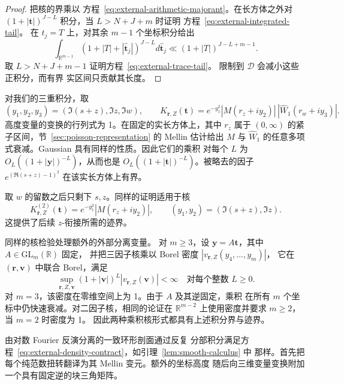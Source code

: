 \begin{proof}
把核的界乘以
方程~\eqref{eq:external-arithmetic-majorant}。在长方体之外对
$(1+|\boldsymbol t|)^{J-L}$ 积分，当 $L>N+J+m$ 时证明
方程~\eqref{eq:external-integrated-tail}。
在 $t_j=T$ 上，对其余 $m-1$ 个坐标积分给出
\[
 \int_{\mathbb R^{m-1}}
 (1+|T|+|\widehat{\boldsymbol t}_j|)^{J-L}
 d\widehat{\boldsymbol t}_j
 \ll(1+|T|)^{J-L+m-1}.
\]
取 $L>N+J+m-1$ 证明方程~\eqref{eq:external-trace-tail}。
限制到 $\mathcal D$ 会减小这些正积分，而有界
实区间只贡献其长度。
\end{proof}

对我们的三重积分，取
\[
 (y_1,y_2,y_3)=(\Im(s+z),\Im z,\Im w),\qquad
 K_{\boldsymbol r,Z}(\boldsymbol t)
 =e^{-y_1^2}|M(r_z+iy_2)|\,|\widehat W_1(r_w+iy_3)|.
\]
高度变量的变换的行列式为 1。在固定的实长方体上，其中 $r_z$ 属于
$(0,\infty)$ 的紧子区间，节~\ref{sec:poisson-representation} 的 Mellin 估计给出 $M$ 与
$\widehat W_1$ 的任意多项式衰减。Gaussian 具有同样的性质。因此它们的乘积
对每个 $L$ 为 $O_L((1+|\boldsymbol y|)^{-L})$，从而也是
$O_L((1+|\boldsymbol t|)^{-L})$。被略去的因子
$e^{(\Re(s+z)-1)^2}$ 在该实长方体上有界。

取 $w$ 的留数之后只剩下 $s,z$。同样的证明适用于核
\begin{equation}
 K^{(2)}_{\boldsymbol r,Z}(\boldsymbol t)
 =e^{-y_1^2}|M(r_z+iy_2)|,
 \qquad(y_1,y_2)=(\Im(s+z),\Im z).
 \label{eq:external-two-dimensional-kernel}
\end{equation}
这提供了后续 $z$-衔接所需的迹界。

同样的核检验处理额外的外部分离变量。
对 $m\ge3$，设 $\boldsymbol y=A\boldsymbol t$，其中 $A\in\mathrm{GL}_m(\mathbb R)$ 固定，
并把三因子核乘以 Borel 密度 $|v_{\boldsymbol r,Z}(y_4,\ldots,y_m)|$，
它在 $(\boldsymbol r,\boldsymbol v)$ 中联合 Borel，满足
\begin{equation}
 \sup_{\boldsymbol r,Z,\boldsymbol v}
 (1+|\boldsymbol v|)^L|v_{\boldsymbol r,Z}(\boldsymbol v)|<\infty
 \quad\text{对每个整数 }L\ge0.
 \label{eq:external-density-contract}
\end{equation}
对 $m=3$，该密度在零维空间上为 1。由于 $A$ 及其逆固定，乘积
在所有 $m$ 个坐标中仍快速衰减。对二因子核，相同的论证在
$\mathbb R^{m-2}$ 上使用密度并要求 $m\ge2$，当 $m=2$ 时密度为 1。
因此两种乘积核形式都具有上述积分界与迹界。

由对数 Fourier 反演分离的一致环形剖面通过反复
分部积分满足方程~\eqref{eq:external-density-contract}，如引理~\ref{lem:smooth-calculus} 中
那样。首先把每个纯范数扭转翻译为其 Mellin 变元。额外的坐标高度
随后向三维变量变换附加一个具有固定逆的块三角矩阵。

